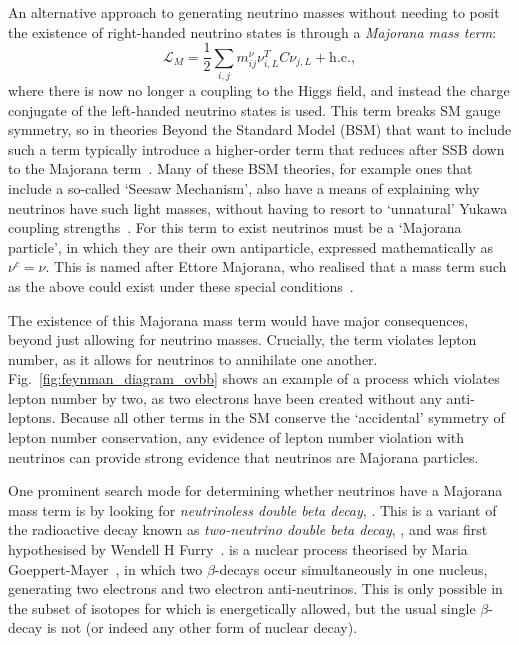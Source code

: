 An alternative approach to generating neutrino masses without needing to posit the existence of right-handed neutrino states is through a \textit{Majorana mass term}:
\begin{equation}
    \mathcal{L}_{M} = \frac{1}{2}\sum_{i,j}m^{\nu}_{ij}\nu^{T}_{i,L}C\nu_{j,L} + \mathrm{ h.c.},
\end{equation}
where there is now no longer a coupling to the Higgs field, and instead the charge conjugate of the left-handed neutrino states is used. This term breaks SM gauge symmetry, so in theories Beyond the Standard Model (BSM) that want to include such a term typically introduce a higher-order term that reduces after SSB down to the Majorana term~\cite{weinbergBaryonLeptonNonconservingProcesses1979}. %
Many of these BSM theories, for example ones that include a so-called `Seesaw Mechanism', also have a means of explaining why neutrinos have such light masses, without having to resort to `unnatural' Yukawa coupling strengths~\cite{minkowskiEgRateOne1977}. %
For this term to exist neutrinos must be a `Majorana particle', in which they are their own antiparticle, expressed mathematically as $\nu^{c} = \nu$. This is named after Ettore Majorana, who realised that a mass term such as the above could exist under these special conditions~\cite{majoranaTeoriaSimmetricaElettrone1937}. %

The existence of this Majorana mass term would have major consequences, beyond just allowing for neutrino masses. Crucially, the term violates lepton number, as it allows for neutrinos to annihilate one another. Fig.~\ref{fig:feynman_diagram_ovbb} shows an example of a process which violates lepton number by two, as two electrons have been created without any anti-leptons. Because all other terms in the SM conserve the `accidental' symmetry of lepton number conservation, any evidence of lepton number violation with neutrinos can provide strong evidence that neutrinos are Majorana particles.

One prominent search mode for determining whether neutrinos have a Majorana mass term is by looking for \textit{neutrinoless double beta decay}, \onbb{}. This is a variant of the radioactive decay known as \textit{two-neutrino double beta decay}, \twonbb{}, and was first hypothesised by Wendell H Furry~\cite{furryTransitionProbabilitiesDouble1939}. %
\twonbb{} is a nuclear process theorised by Maria Goeppert-Mayer~\cite{goeppert-mayerDoubleBetaDisintegration1935}, %
in which two $\beta$-decays occur simultaneously in one nucleus, generating two electrons and two electron anti-neutrinos. This is only possible in the subset of isotopes for which \twonbb{} is energetically allowed, but the usual single $\beta$-decay is not (or indeed any other form of nuclear decay).

